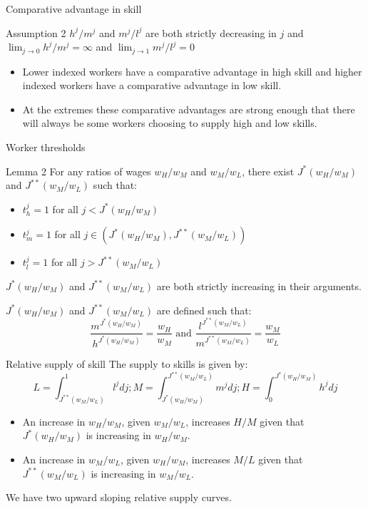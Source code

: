 \documentclass[notes=show]{beamer}
\begin{document}
\begin{frame}{Comparative advantage in skill}
\begin{block}{Assumption 2}
$h^{j}/m^{j}$ and $m^{j}/l^{j}$ are both strictly decreasing in $j$ and $ \lim_{j \rightarrow 0} h^{j}/m^{j} = \infty$ and $ \lim_{j \rightarrow 1} m^{j}/l^{j} = 0$ 
\end{block}
\begin{itemize}
\item Lower indexed workers have a comparative advantage in high skill and higher indexed workers have a comparative advantage in low skill. \medskip
\item At the extremes these comparative advantages are strong enough that there will always be some workers choosing to supply high and low skills.
\end{itemize}
\end{frame}

\begin{frame}{Worker thresholds}
\begin{block}{Lemma 2}
For any ratios of wages $w_{H}/w_{M}$ and $w_{M}/w_{L}$, there exist $J^{*}(w_{H}/w_{M})$ and $J^{**}(w_{M}/w_{L})$ such that:
\begin{itemize}
\item $t_{h}^{j} = 1$ for all $j < J^{*}(w_{H}/w_{M})$
\item $t_{m}^{j} = 1$ for all $j \in ( J^{*}(w_{H}/w_{M}), J^{**}(w_{M}/w_{L}))$
\item $t_{l}^{j} = 1$ for all $j >  J^{**}(w_{M}/w_{L})$
\end{itemize}
$J^{*}(w_{H}/w_{M})$ and $J^{**}(w_{M}/w_{L})$ are both strictly increasing in their arguments. 
\end{block}
$J^{*}(w_{H}/w_{M})$ and $J^{**}(w_{M}/w_{L})$ are defined such that:
\[
\frac{m^{J^{*}(w_{H}/w_{M})}}{h^{J^{*}(w_{H}/w_{M})}}=\frac{w_{H}}{w_{M}} \text{ and } \frac{l^{J^{**}(w_{M}/w_{L})}}{m^{J^{**}(w_{M}/w_{L})}}=\frac{w_{M}}{w_{L}}
\]
\end{frame}

\begin{frame}{Relative supply of skill}
The supply to skills is given by: \medskip
\[
L = \int_{J^{**}(w_{M}/w_{L})}^{1} l^{j}dj ; M = \int_{J^{*}(w_{H}/w_{M})}^{J^{**}(w_{M}/w_{L})} m^{j}dj ; H = \int_{0}^{J^{*}(w_{H}/w_{M})} h^{j}dj
\]
\begin{itemize}
\item An increase in $w_{H}/w_{M}$, given $w_{M}/w_{L}$, increases $H/M$ given that $J^{*}(w_{H}/w_{M})$ is increasing in $w_{H}/w_{M}$. \medskip
\item An increase in $w_{M}/w_{L}$, given $w_{H}/w_{M}$, increases $M/L$ given that $J^{**}(w_{M}/w_{L})$ is increasing in $w_{M}/w_{L}$.
\end{itemize}
We have two upward sloping relative supply curves. 
\end{frame}
\end{document}
